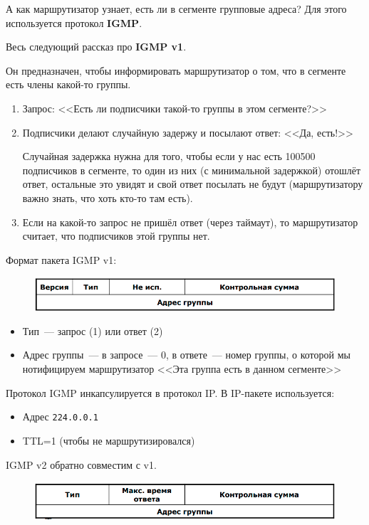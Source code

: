А как маршрутизатор узнает, есть ли в сегменте групповые адреса? Для этого используется протокол {\bf IGMP}.

Весь следующий рассказ про {\bf IGMP v1}.

Он предназначен, чтобы информировать маршрутизатор о том, что в сегменте есть члены какой-то группы.

\begin{enumerate}
    \item Запрос: <<Есть ли подписчики такой-то группы в этом сегменте?>>
    \item Подписчики делают случайную задержу и посылают ответ: <<Да, есть!>>

    Случайная задержка нужна для того, чтобы если у нас есть 100500 подписчиков в сегменте, то один из них (с минимальной задержкой) отошлёт ответ, остальные это увидят и свой ответ посылать не будут (маршрутизатору важно знать, что хоть кто-то там есть).
    \item Если на какой-то запрос не пришёл ответ (через таймаут), то маршрутизатор считает, что подписчиков этой группы нет.
\end{enumerate}

Формат пакета IGMP v1:

\begin{figure}[H]
  \centering
  \includegraphics[width=15cm]{images/02/07}
\end{figure}

\begin{itemize}
    \item Тип~--- запрос (1) или ответ (2)
    \item Адрес группы~--- в запросе~--- 0, в ответе~--- номер группы, о которой мы нотифицируем маршрутизатор <<Эта группа есть в данном сегменте>>
\end{itemize}

Протокол IGMP инкапсулируется в протокол IP. В IP-пакете используется:
\begin{itemize}
    \item Адрес {\tt 224.0.0.1}
    \item TTL=1 (чтобы не маршрутизировался)
\end{itemize}

IGMP v2 обратно совместим с v1.

\begin{figure}[H]
  \centering
  \includegraphics[width=15cm]{images/02/08}
\end{figure}

